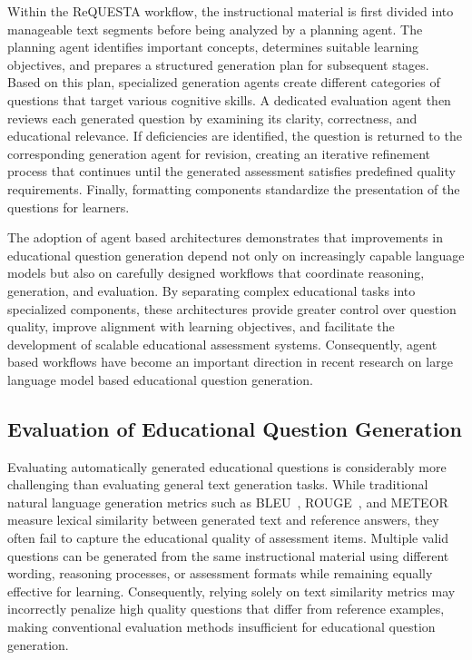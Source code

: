 Within the ReQUESTA workflow, the instructional material is first divided into manageable text segments before being analyzed by a planning agent. The planning agent identifies important concepts, determines suitable learning objectives, and prepares a structured generation plan for subsequent stages. Based on this plan, specialized generation agents create different categories of questions that target various cognitive skills. A dedicated evaluation agent then reviews each generated question by examining its clarity, correctness, and educational relevance. If deficiencies are identified, the question is returned to the corresponding generation agent for revision, creating an iterative refinement process that continues until the generated assessment satisfies predefined quality requirements. Finally, formatting components standardize the presentation of the questions for learners.

The adoption of agent based architectures demonstrates that improvements in educational question generation depend not only on increasingly capable language models but also on carefully designed workflows that coordinate reasoning, generation, and evaluation. By separating complex educational tasks into specialized components, these architectures provide greater control over question quality, improve alignment with learning objectives, and facilitate the development of scalable educational assessment systems. Consequently, agent based workflows have become an important direction in recent research on large language model based educational question generation.
\subsection{Evaluation of Educational Question Generation}
\label{sec:back-evaluation}

Evaluating automatically generated educational questions is considerably more challenging than evaluating general text generation tasks. While traditional natural language generation metrics such as BLEU~\cite{papineni2002bleu}, ROUGE~\cite{lin2004rouge}, and METEOR measure lexical similarity between generated text and reference answers, they often fail to capture the educational quality of assessment items. Multiple valid questions can be generated from the same instructional material using different wording, reasoning processes, or assessment formats while remaining equally effective for learning. Consequently, relying solely on text similarity metrics may incorrectly penalize high quality questions that differ from reference examples, making conventional evaluation methods insufficient for educational question generation.

